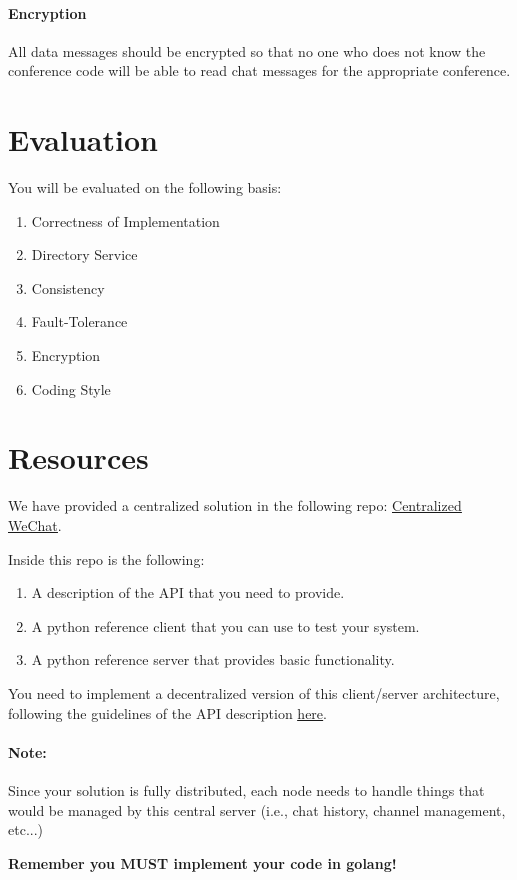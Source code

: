 \documentclass[12pt]{article}
\begin{document}
\paragraph{Encryption}
All data messages should be encrypted so that no one who does not know the conference code will be able to read chat messages for the appropriate conference. 







\section{Evaluation}
You will be evaluated on the following basis:
\begin{enumerate}
\item Correctness of Implementation
\item Directory Service
\item Consistency
\item Fault-Tolerance
\item Encryption
\item Coding Style
\end{enumerate}

\section{Resources}

We have provided a centralized solution in the following repo: \href{https://github.com/jvilk/WeChat}{\underline{Centralized WeChat}}. 

Inside this repo is the following:
\begin{enumerate}
\item A description of the API that you need to provide.
\item A python reference client that you can use to test your system.
\item A python reference server that provides basic functionality.
\end{enumerate}

You need to implement a decentralized version of this client/server architecture, following the guidelines of the API description \href{https://github.com/jvilk/WeChat/blob/master/reference_client/api.txt}{\underline{here}}. 

\paragraph{Note:} Since your solution is fully distributed, each node needs to handle things that would be managed by this central server (i.e., chat history, channel management, etc...) 

\bf{Remember you MUST implement your code in golang!}
\end{document}
